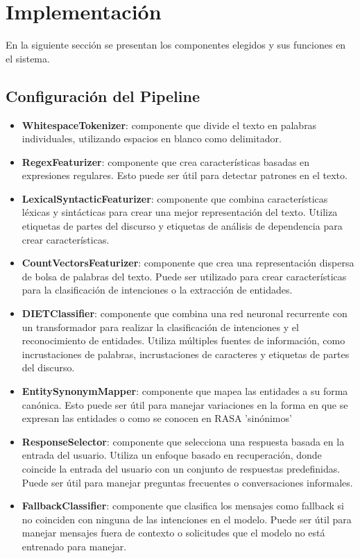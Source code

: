 \section{Implementación}
En la siguiente sección se presentan los componentes elegidos y sus funciones en el
sistema.
\subsection{Configuración del Pipeline}
\begin{itemize}
	\item \textbf{WhitespaceTokenizer}: componente que divide el texto en palabras
	      individuales, utilizando espacios en blanco como delimitador.
	      \cite{Configuration_Documentation}
	\item \textbf{RegexFeaturizer}: componente que crea características basadas en expresiones
	      regulares. Esto puede ser útil para detectar patrones en el texto.
	      \cite{Configuration_Documentation}
	\item \textbf{LexicalSyntacticFeaturizer}: componente que combina características léxicas y
	      sintácticas para crear una mejor representación del texto. Utiliza etiquetas de
	      partes del discurso
	      y etiquetas de análisis de dependencia para crear características.
	      \cite{Configuration_Documentation}
	\item \textbf{CountVectorsFeaturizer}: componente que crea una representación dispersa de
	      bolsa de
	      palabras del texto. Puede ser utilizado para crear características para la
	      clasificación de
	      intenciones o la extracción de entidades. \cite{Configuration_Documentation}
	\item \textbf{DIETClassifier}: componente que combina una red neuronal recurrente con un
	      transformador para realizar la clasificación de intenciones y el reconocimiento de
	      entidades.
	      Utiliza múltiples fuentes de información, como incrustaciones de palabras,
	      incrustaciones de
	      caracteres y etiquetas de partes del discurso. \cite{Configuration_Documentation}
	\item \textbf{EntitySynonymMapper}: componente que mapea las entidades a su forma canónica. Esto puede ser útil para manejar variaciones en la forma en que se expresan las entidades o como se conocen en RASA 'sinónimos'\cite{Configuration_Documentation}
	\item \textbf{ResponseSelector}: componente que selecciona una respuesta basada en la
	      entrada del
	      usuario. Utiliza un enfoque basado en recuperación, donde coincide la entrada del
	      usuario con un
	      conjunto de respuestas predefinidas. Puede ser útil para manejar preguntas frecuentes
	      o
	      conversaciones informales.\cite{Configuration_Documentation}
	\item \textbf{FallbackClassifier}: componente que clasifica los mensajes como fallback si no coinciden con ninguna de las intenciones en el modelo. Puede ser útil para manejar mensajes fuera de contexto o solicitudes que el modelo no está entrenado para manejar.\cite{Configuration_Documentation}
\end{itemize}

